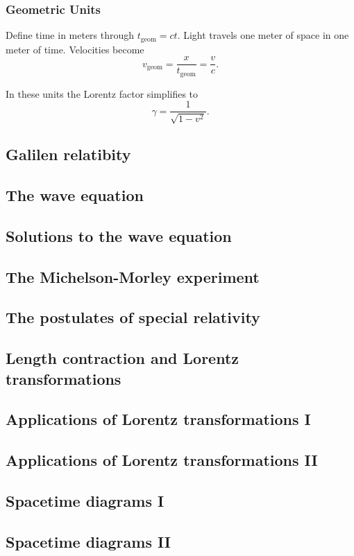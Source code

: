 \documentclass{article}
\begin{document}
\subsubsection{Geometric Units}

Define time in meters through \(t_{\text{geom}} = ct\). Light travels one meter of space in one meter of time. Velocities become
\[
v_{\text{geom}} = \frac{x}{t_{\text{geom}}} = \frac{v}{c}.
\]

In these units the Lorentz factor simplifies to
\[
\gamma = \frac{1}{\sqrt{1 - v^2}}.
\]


\subsection{Galilen relatibity}
\subsection{The wave equation}
\subsection{Solutions to the wave equation}
\subsection{The Michelson-Morley experiment}
\subsection{The postulates of special relativity}
\subsection{Length contraction and Lorentz transformations}
\subsection{Applications of Lorentz transformations I}
\subsection{Applications of Lorentz transformations II}
\subsection{Spacetime diagrams I}
\subsection{Spacetime diagrams II}
\end{document}
